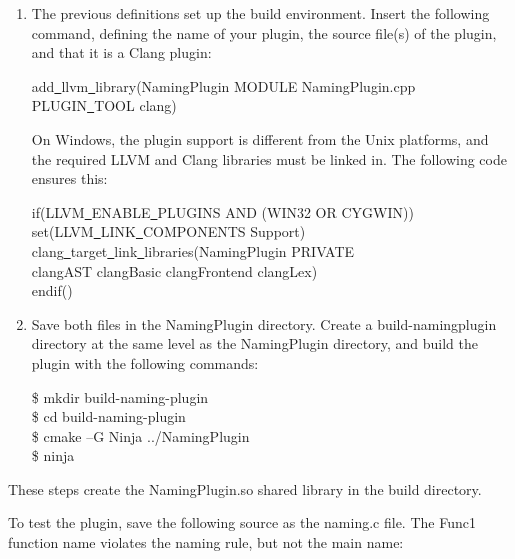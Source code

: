 \begin{enumerate}
\item The previous definitions set up the build environment. Insert the following command, defining the name of your plugin, the source file(s) of the plugin, and that it is a Clang plugin:
\begin{tcolorbox}[colback=white,colframe=black]
add\underline{~}llvm\underline{~}library(NamingPlugin MODULE NamingPlugin.cpp \\
\hspace*{3cm}PLUGIN\underline{~}TOOL clang)
\end{tcolorbox}

On Windows, the plugin support is different from the Unix platforms, and the required LLVM and Clang libraries must be linked in. The following code ensures this:
\begin{tcolorbox}[colback=white,colframe=black]
if(LLVM\underline{~}ENABLE\underline{~}PLUGINS AND (WIN32 OR CYGWIN)) \\
\hspace*{0.5cm}set(LLVM\underline{~}LINK\underline{~}COMPONENTS Support) \\
\hspace*{0.5cm}clang\underline{~}target\underline{~}link\underline{~}libraries(NamingPlugin PRIVATE \\
\hspace*{1cm}clangAST clangBasic clangFrontend clangLex) \\
endif()
\end{tcolorbox}

\item Save both files in the NamingPlugin directory. Create a build-namingplugin directory at the same level as the NamingPlugin directory, and build the plugin with the following commands:
\begin{tcolorbox}[colback=white,colframe=black]
\$ mkdir build-naming-plugin \\
\$ cd build-naming-plugin \\
\$ cmake –G Ninja ../NamingPlugin \\
\$ ninja
\end{tcolorbox}

\end{enumerate}

These steps create the NamingPlugin.so shared library in the build directory.\par

To test the plugin, save the following source as the naming.c file. The Func1 function name violates the naming rule, but not the main name:\par

